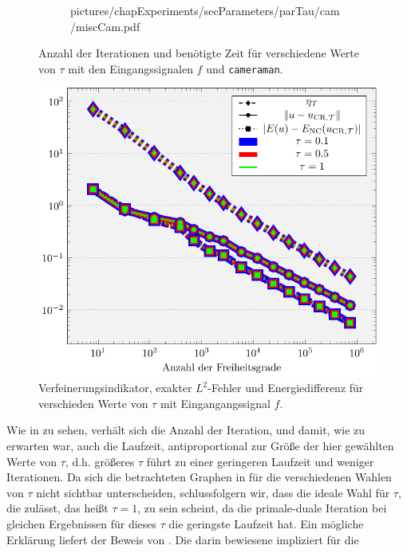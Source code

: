 \begin{figure}[p]
\begin{subfigure}[b]{.48\linewidth}
      {pictures/chapExperiments/secParameters/parTau/cam/miscCam.pdf}
    \label{fig:parTauMiscCam}
  \end{subfigure}
  \caption{Anzahl der Iterationen und benötigte Zeit für verschiedene Werte
  von $\tau$ mit den Eingangssignalen $f$ und \texttt{cameraman}.}
  \label{fig:parTauMisc}
\end{figure}
\begin{figure}[p]
  \centering
  \includegraphics[width=\linewidth]
    {pictures/chapExperiments/secParameters/parTau/f01/convergenceF.pdf}
  \caption{Verfeinerungsindikator, exakter $L^2$-Fehler und Energiedifferenz 
  für verschieden Werte von $\tau$ mit Eingangangssignal $f$.}
  \label{fig:parTauConvergence}
\end{figure}
Wie in  zu sehen, verhält sich die Anzahl der Iteration,
und damit, wie zu erwarten war, auch die Laufzeit, antiproportional zur Größe
der hier gewählten Werte von $\tau$, d.h. größeres $\tau$ führt zu einer
geringeren Laufzeit und weniger Iterationen.
Da sich die betrachteten Graphen in  für die
verschiedenen Wahlen von $\tau$ nicht sichtbar unterscheiden, schlussfolgern
wir, dass die ideale Wahl für $\tau$, die 
zulässt, das heißt $\tau=1$, zu sein scheint, da die primale-duale Iteration
bei gleichen Ergebnissen für dieses $\tau$ die geringste Laufzeit hat.
Ein mögliche Erklärung liefert der Beweis von .
Die darin bewiesene  impliziert für die
